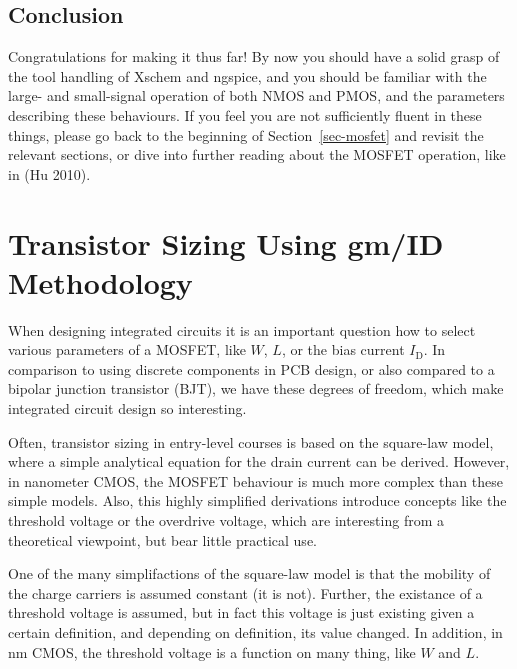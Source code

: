 \documentclass[
  a4paper,
  DIV=11,
  numbers=noendperiod]{scrartcl}
\begin{document}
\subsection{Conclusion}\label{conclusion}

Congratulations for making it thus far! By now you should have a solid
grasp of the tool handling of Xschem and ngspice, and you should be
familiar with the large- and small-signal operation of both NMOS and
PMOS, and the parameters describing these behaviours. If you feel you
are not sufficiently fluent in these things, please go back to the
beginning of Section~\ref{sec-mosfet} and revisit the relevant sections,
or dive into further reading about the MOSFET operation, like in (Hu
2010).

\section{Transistor Sizing Using gm/ID
Methodology}\label{sec-gmid-method}

When designing integrated circuits it is an important question how to
select various parameters of a MOSFET, like \(W\), \(L\), or the bias
current \(I_\mathrm{D}\). In comparison to using discrete components in
PCB design, or also compared to a bipolar junction transistor (BJT), we
have these degrees of freedom, which make integrated circuit design so
interesting.

Often, transistor sizing in entry-level courses is based on the
square-law model, where a simple analytical equation for the drain
current can be derived. However, in nanometer CMOS, the MOSFET behaviour
is much more complex than these simple models. Also, this highly
simplified derivations introduce concepts like the threshold voltage or
the overdrive voltage, which are interesting from a theoretical
viewpoint, but bear little practical use.

\begin{tcolorbox}[enhanced jigsaw, breakable, title=\textcolor{quarto-callout-note-color}{\faInfo}\hspace{0.5em}{MOSFET Square-Law Model}, left=2mm, bottomrule=.15mm, opacitybacktitle=0.6, opacityback=0, colframe=quarto-callout-note-color-frame, leftrule=.75mm, bottomtitle=1mm, colbacktitle=quarto-callout-note-color!10!white, toprule=.15mm, rightrule=.15mm, toptitle=1mm, titlerule=0mm, arc=.35mm, colback=white, coltitle=black]

One of the many simplifactions of the square-law model is that the
mobility of the charge carriers is assumed constant (it is not).
Further, the existance of a threshold voltage is assumed, but in fact
this voltage is just existing given a certain definition, and depending
on definition, its value changed. In addition, in nm CMOS, the threshold
voltage is a function on many thing, like \(W\) and \(L\).

\end{tcolorbox}
\end{document}
